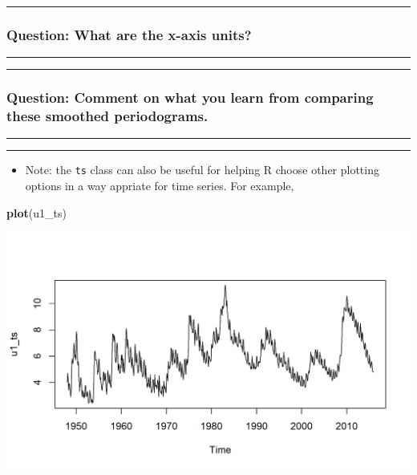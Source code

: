 \documentclass[]{article}
\newenvironment{Shaded}{\begin{snugshade}}{\end{snugshade}}
\newcommand{\KeywordTok}[1]{\textcolor[rgb]{0.13,0.29,0.53}{\textbf{#1}}}
\newcommand{\NormalTok}[1]{#1}
\providecommand{\tightlist}{%
  \setlength{\itemsep}{0pt}\setlength{\parskip}{0pt}}
\begin{document}
\begin{center}\rule{0.5\linewidth}{\linethickness}\end{center}

\subsubsection{Question: What are the x-axis
units?}\label{question-what-are-the-x-axis-units}

\begin{center}\rule{0.5\linewidth}{\linethickness}\end{center}

\begin{center}\rule{0.5\linewidth}{\linethickness}\end{center}

\subsubsection{Question: Comment on what you learn from comparing these
smoothed
periodograms.}\label{question-comment-on-what-you-learn-from-comparing-these-smoothed-periodograms.}

\begin{center}\rule{0.5\linewidth}{\linethickness}\end{center}

\begin{center}\rule{0.5\linewidth}{\linethickness}\end{center}

\begin{itemize}
\tightlist
\item
  Note: the \texttt{ts} class can also be useful for helping R choose
  other plotting options in a way appriate for time series. For example,
\end{itemize}

\begin{Shaded}
\begin{Highlighting}[]
\KeywordTok{plot}\NormalTok{(u1_ts)}
\end{Highlighting}
\end{Shaded}

\begin{center}\includegraphics{figure/intro-plot.ts-1} \end{center}
\end{document}
